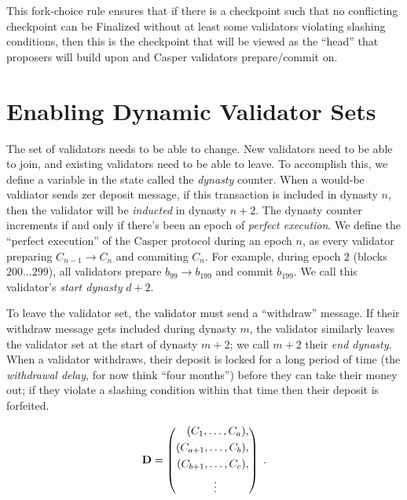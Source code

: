 \documentclass[12pt]{article}
\begin{document}
This fork-choice rule ensures that if there is a checkpoint such that no conflicting checkpoint can be Finalized without at least some validators violating slashing conditions, then this is the checkpoint that will be viewed as the ``head'' that proposers will build upon and Casper validators prepare/commit on.

\section{Enabling Dynamic Validator Sets}
\label{sect:join_and_leave}

The set of validators needs to be able to change.  New validators need to be able to join, and existing validators need to be able to leave.  To accomplish this, we define a variable in the state called the \textit{dynasty} counter. When a would-be valdiator sends zer deposit message, if this transaction is included in dynasty $n$, then the validator will be \textit{inducted} in dynasty $n+2$. The dynasty counter increments if and only if there's been an epoch of \emph{perfect execution}.  We define the ``perfect execution'' of the Casper protocol during an epoch $n$, as every validator preparing $C_{n-1} \to C_{n}$ and commiting $C_{n}$.  For example, during epoch $2$ (blocks $200 \ldots 299$), all validators prepare $b_{99} \to b_{199}$ and commit $b_{199}$.  We call this validator's \textit{start dynasty} $d+2$.

To leave the validator set, the validator must send a ``withdraw'' message. If their withdraw message gets included during dynasty $m$, the validator similarly leaves the validator set at the start of dynasty $m+2$; we call $m+2$ their \textit{end dynasty}. When a validator withdraws, their deposit is locked for a long period of time (the \textit{withdrawal delay}, for now think ``four months'') before they can take their money out; if they violate a slashing condition within that time then their deposit is forfeited. 

\begin{equation}
\mathbf{D} = \left( \begin{split} (C_1, \ldots, C_a), \\ (C_{a+1}, \ldots, C_b), \\ (C_{b+1}, \ldots, C_c), \\ \vdots \hspace{0.4in} \end{split}  \right) \; .
\end{equation}
\end{document}
